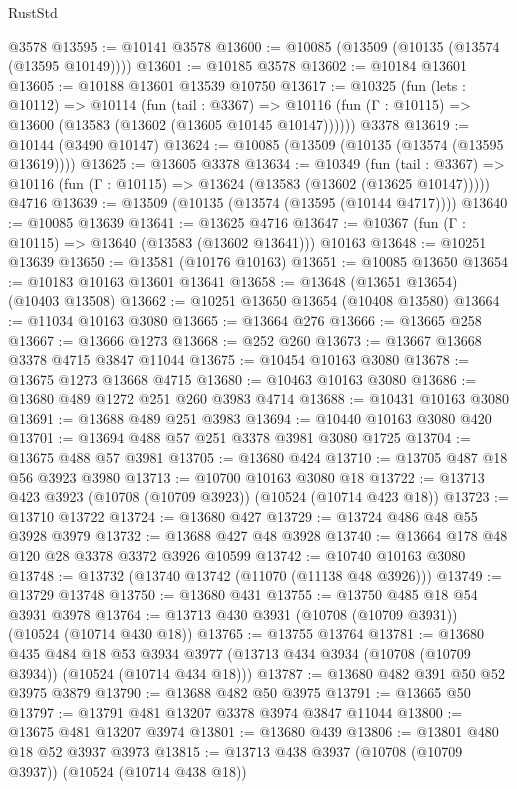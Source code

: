 \begin{lexlean}{RustStd}
\begin{coremodule}
    @3578
@13595 := @10141 @3578
@13600 := @10085 (@13509 (@10135 (@13574 (@13595 @10149))))
@13601 := @10185 @3578
@13602 := @10184 @13601
@13605 := @10188 @13601 @13539 @10750
@13617 := @10325
    (fun (lets : @10112) =>
    @10114
      (fun (tail : @3367) =>
      @10116 (fun (Γ : @10115) => @13600 (@13583 (@13602 (@13605 @10145 @10147))))))
    @3378
@13619 := @10144 (@3490 @10147)
@13624 := @10085 (@13509 (@10135 (@13574 (@13595 @13619))))
@13625 := @13605 @3378
@13634 := @10349
    (fun (tail : @3367) => @10116 (fun (Γ : @10115) => @13624 (@13583 (@13602 (@13625 @10147)))))
    @4716
@13639 := @13509 (@10135 (@13574 (@13595 (@10144 @4717))))
@13640 := @10085 @13639
@13641 := @13625 @4716
@13647 := @10367 (fun (Γ : @10115) => @13640 (@13583 (@13602 @13641))) @10163
@13648 := @10251 @13639
@13650 := @13581 (@10176 @10163)
@13651 := @10085 @13650
@13654 := @10183 @10163 @13601 @13641
@13658 := @13648 (@13651 @13654) (@10403 @13508)
@13662 := @10251 @13650 @13654 (@10408 @13580)
@13664 := @11034 @10163 @3080
@13665 := @13664 @276
@13666 := @13665 @258
@13667 := @13666 @1273
@13668 := @252 @260
@13673 := @13667 @13668 @3378 @4715 @3847 @11044
@13675 := @10454 @10163 @3080
@13678 := @13675 @1273 @13668 @4715
@13680 := @10463 @10163 @3080
@13686 := @13680 @489 @1272 @251 @260 @3983 @4714
@13688 := @10431 @10163 @3080
@13691 := @13688 @489 @251 @3983
@13694 := @10440 @10163 @3080 @420
@13701 := @13694 @488 @57 @251 @3378 @3981 @3080 @1725
@13704 := @13675 @488 @57 @3981
@13705 := @13680 @424
@13710 := @13705 @487 @18 @56 @3923 @3980
@13713 := @10700 @10163 @3080 @18
@13722 := @13713 @423 @3923 (@10708 (@10709 @3923)) (@10524 (@10714 @423 @18))
@13723 := @13710 @13722
@13724 := @13680 @427
@13729 := @13724 @486 @48 @55 @3928 @3979
@13732 := @13688 @427 @48 @3928
@13740 := @13664 @178 @48 @120 @28 @3378 @3372 @3926 @10599
@13742 := @10740 @10163 @3080
@13748 := @13732 (@13740 @13742 (@11070 (@11138 @48 @3926)))
@13749 := @13729 @13748
@13750 := @13680 @431
@13755 := @13750 @485 @18 @54 @3931 @3978
@13764 := @13713 @430 @3931 (@10708 (@10709 @3931)) (@10524 (@10714 @430 @18))
@13765 := @13755 @13764
@13781 := @13680
    @435
    @484
    @18
    @53
    @3934
    @3977
    (@13713 @434 @3934 (@10708 (@10709 @3934)) (@10524 (@10714 @434 @18)))
@13787 := @13680 @482 @391 @50 @52 @3975 @3879
@13790 := @13688 @482 @50 @3975
@13791 := @13665 @50
@13797 := @13791 @481 @13207 @3378 @3974 @3847 @11044
@13800 := @13675 @481 @13207 @3974
@13801 := @13680 @439
@13806 := @13801 @480 @18 @52 @3937 @3973
@13815 := @13713 @438 @3937 (@10708 (@10709 @3937)) (@10524 (@10714 @438 @18))

\end{coremodule}
\end{lexlean}
